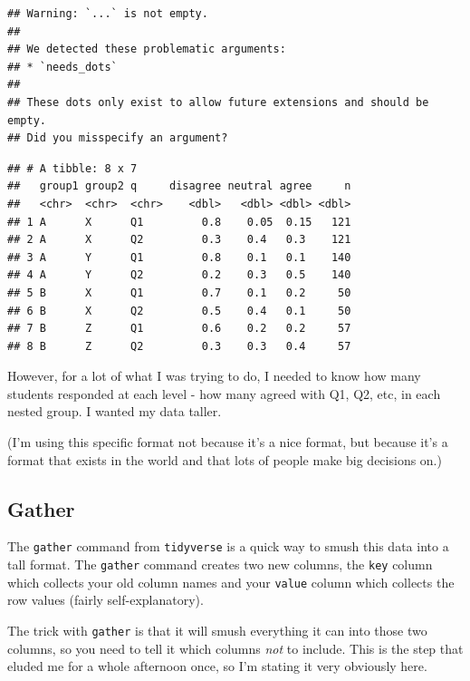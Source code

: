 \documentclass[
]{book}
\newenvironment{Shaded}{\begin{snugshade}}{\end{snugshade}}
\newcommand{\DataTypeTok}[1]{\textcolor[rgb]{0.13,0.29,0.53}{#1}}
\newcommand{\KeywordTok}[1]{\textcolor[rgb]{0.13,0.29,0.53}{\textbf{#1}}}
\newcommand{\NormalTok}[1]{#1}
\newcommand{\OperatorTok}[1]{\textcolor[rgb]{0.81,0.36,0.00}{\textbf{#1}}}
\newcommand{\StringTok}[1]{\textcolor[rgb]{0.31,0.60,0.02}{#1}}
\begin{document}
\begin{verbatim}
## Warning: `...` is not empty.
## 
## We detected these problematic arguments:
## * `needs_dots`
## 
## These dots only exist to allow future extensions and should be empty.
## Did you misspecify an argument?
\end{verbatim}

\begin{verbatim}
## # A tibble: 8 x 7
##   group1 group2 q     disagree neutral agree     n
##   <chr>  <chr>  <chr>    <dbl>   <dbl> <dbl> <dbl>
## 1 A      X      Q1         0.8    0.05  0.15   121
## 2 A      X      Q2         0.3    0.4   0.3    121
## 3 A      Y      Q1         0.8    0.1   0.1    140
## 4 A      Y      Q2         0.2    0.3   0.5    140
## 5 B      X      Q1         0.7    0.1   0.2     50
## 6 B      X      Q2         0.5    0.4   0.1     50
## 7 B      Z      Q1         0.6    0.2   0.2     57
## 8 B      Z      Q2         0.3    0.3   0.4     57
\end{verbatim}

However, for a lot of what I was trying to do, I needed to know how many students responded at each level - how many agreed with Q1, Q2, etc, in each nested group. I wanted my data taller.

(I'm using this specific format not because it's a nice format, but because it's a format that exists in the world and that lots of people make big decisions on.)

\hypertarget{gather}{%
\subsection{Gather}\label{gather}}

The \texttt{gather} command from \texttt{tidyverse} is a quick way to smush this data into a tall format. The \texttt{gather} command creates two new columns, the \texttt{key} column which collects your old column names and your \texttt{value} column which collects the row values (fairly self-explanatory).

The trick with \texttt{gather} is that it will smush everything it can into those two columns, so you need to tell it which columns \emph{not} to include. This is the step that eluded me for a whole afternoon once, so I'm stating it very obviously here.

\begin{Shaded}
\end{Shaded}
\end{document}
